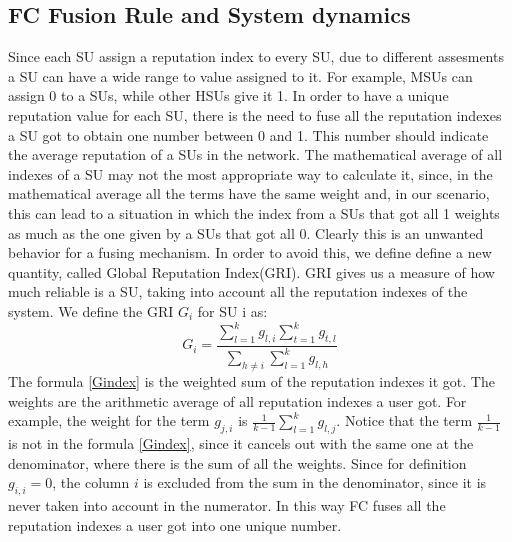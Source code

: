 \documentclass[letterpaper, 10 pt, conference]{ieeeconf}  %
\begin{document}
\subsection{FC Fusion Rule and System dynamics}
Since each SU assign a reputation index to every SU, due to different assesments a SU can have a wide range to value assigned to it. For example, MSUs can assign 0 to a SUs, while other HSUs give it 1. In order to have a unique reputation value for each SU, there is the need to fuse all the reputation indexes a SU got to obtain one number between 0 and 1. This number should indicate the average reputation of a SUs in the network. 
The mathematical average of all indexes of a SU may not the most appropriate way to calculate it, since, in the mathematical average all the terms have the same weight and, in our scenario, this can lead to a situation in which the index from a SUs that got all 1 weights as much as the one given by a SUs that got all 0. Clearly this is an unwanted behavior for a fusing mechanism.
In order to avoid this, we define define a new quantity, called Global Reputation Index(GRI). GRI gives us a measure of how much reliable is a SU, taking into account all the reputation indexes of the system.
We define the GRI $G_i$ for SU i as: 
\begin{equation}
G_i=\frac{\sum\limits_{l=1}^{k}g_{l,i}\sum\limits_{t=1}^{k}g_{t,l}}{\sum\limits_{h\neq i}\sum\limits_{l=1}^{k}g_{l,h}}
\label{Gindex}
\end{equation}
The formula \ref{Gindex} is the weighted sum of the reputation indexes it got. The weights are the arithmetic average of all reputation indexes a user got. For example, the weight for the term $g_{j,i}$ is $\frac{1}{k-1}\sum\limits_{l=1}^k g_{l,j}$. Notice that the term $\frac{1}{k-1}$ is not in the formula \ref{Gindex}, since it cancels out with the same one at the denominator, where there is the sum of all the weights. Since for definition $g_{i,i}=0$, the column $i$ is excluded from the sum in the denominator, since it is never taken into account in the numerator. In this way FC fuses all the reputation indexes a user got into one unique number. 
\end{document}

